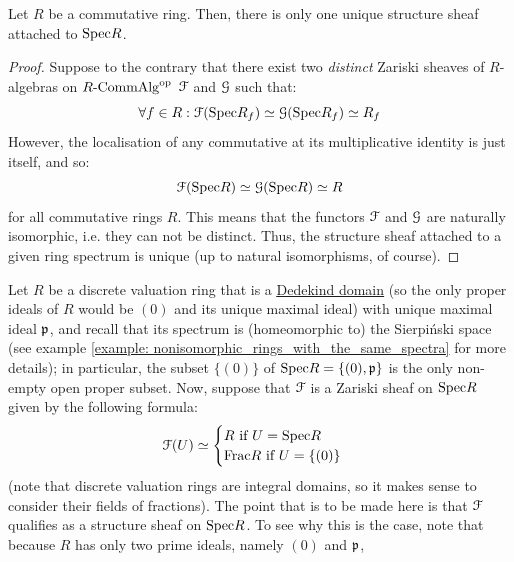             \begin{proposition} \label{prop: structure_sheaf_uniqueness}
                Let $R$ be a commutative ring. Then, there is only one unique structure sheaf attached to $\mathrm{Spec} R$. 
            \end{proposition}
                \begin{proof}
                    Suppose to the contrary that there exist two \textit{distinct} Zariski sheaves of $R$-algebras on $R\text{-}\mathrm{Comm}\mathrm{Alg}^{\mathrm{op}}$ $\mathcal{F}$ and $\mathcal{G}$ such that:
                        $$\forall f \in R: \mathcal{F}(\mathrm{Spec} R_f) \simeq \mathcal{G}(\mathrm{Spec} R_f) \simeq R_f$$
                    However, the localisation of any commutative at its multiplicative identity is just itself, and so:
                        $$\mathcal{F}(\mathrm{Spec} R) \simeq \mathcal{G}(\mathrm{Spec} R) \simeq R$$
                    for all commutative rings $R$. This means that the functors $\mathcal{F}$ and $\mathcal{G}$ are naturally isomorphic, i.e. they can not be distinct. Thus, the structure sheaf attached to a given ring spectrum is unique (up to natural isomorphisms, of course).
                \end{proof}
                
            \begin{example}
                Let $R$ be a discrete valuation ring that is a \href{https://en.wikipedia.org/wiki/Dedekind_domain}{\underline{Dedekind domain}} (so the only proper ideals of $R$ would be $(0)$ and its unique maximal ideal) with unique maximal ideal $\mathfrak{p}$, and recall that its spectrum is (homeomorphic to) the Sierpi\'nski space (see example \ref{example: nonisomorphic_rings_with_the_same_spectra} for more details); in particular, the subset $\{(0)\}$ of $\mathrm{Spec} R = \{(0), \mathfrak{p}\}$ is the only non-empty open proper subset. Now, suppose that $\mathcal{F}$ is a Zariski sheaf on $\mathrm{Spec} R$ given by the following formula:
                    $$
                        \mathcal{F}(U) \simeq 
                        \begin{cases}
                            \text{$R$ if $U = \mathrm{Spec} R$}
                            \\
                            \text{$\mathrm{Frac} R$ if $U = \{(0)\}$}
                        \end{cases}
                    $$
                (note that discrete valuation rings are integral domains, so it makes sense to consider their fields of fractions). The point that is to be made here is that $\mathcal{F}$ qualifies as a structure sheaf on $\mathrm{Spec} R$. To see why this is the case, note that because $R$ has only two prime ideals, namely $(0)$ and $\mathfrak{p}$, 
            \end{example}
            
